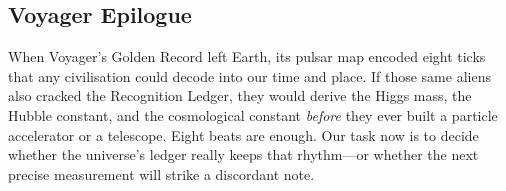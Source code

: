 \documentclass[11pt]{article}
\begin{document}
\subsection*{Voyager Epilogue}

When Voyager’s Golden Record left Earth, its pulsar map encoded eight
ticks that any civilisation could decode into our time and place.  If
those same aliens also cracked the Recognition Ledger, they would derive
the Higgs mass, the Hubble constant, and the cosmological constant
\emph{before} they ever built a particle accelerator or a telescope.
Eight beats are enough.  Our task now is to decide whether the universe’s
ledger really keeps that rhythm—or whether the next precise
measurement will strike a discordant note.


\appendix
\end{document}
